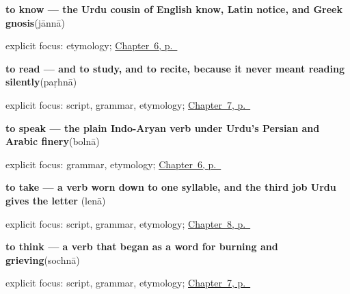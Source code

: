 \noindent\begin{minipage}[t]{\linewidth}
\raggedright
\textbf{to know — the Urdu cousin of English know, Latin notice, and Greek gnosis}\enspace\emph{}\enspace(jānnā)\par
\footnotesize explicit focus: etymology; \hyperref[ch:ur-core-verbs]{Chapter~6, p.~\pageref*{ch:ur-core-verbs}}
\end{minipage}\par\smallskip

\noindent\begin{minipage}[t]{\linewidth}
\raggedright
\textbf{to read — and to study, and to recite, because it never meant reading silently}\enspace\emph{}\enspace(paṛhnā)\par
\footnotesize explicit focus: script, grammar, etymology; \hyperref[ch:ur-mind-verbs]{Chapter~7, p.~\pageref*{ch:ur-mind-verbs}}
\end{minipage}\par\smallskip

\noindent\begin{minipage}[t]{\linewidth}
\raggedright
\textbf{to speak — the plain Indo-Aryan verb under Urdu's Persian and Arabic finery}\enspace\emph{}\enspace(bolnā)\par
\footnotesize explicit focus: grammar, etymology; \hyperref[ch:ur-core-verbs]{Chapter~6, p.~\pageref*{ch:ur-core-verbs}}
\end{minipage}\par\smallskip

\noindent\begin{minipage}[t]{\linewidth}
\raggedright
\textbf{to take — a verb worn down to one syllable, and the third job Urdu gives the letter }\enspace\emph{}\enspace(lenā)\par
\footnotesize explicit focus: script, grammar, etymology; \hyperref[ch:ur-social-verbs]{Chapter~8, p.~\pageref*{ch:ur-social-verbs}}
\end{minipage}\par\smallskip

\noindent\begin{minipage}[t]{\linewidth}
\raggedright
\textbf{to think — a verb that began as a word for burning and grieving}\enspace\emph{}\enspace(sochnā)\par
\footnotesize explicit focus: script, grammar, etymology; \hyperref[ch:ur-mind-verbs]{Chapter~7, p.~\pageref*{ch:ur-mind-verbs}}
\end{minipage}\par\smallskip

